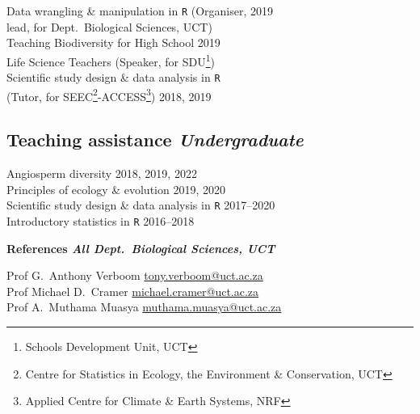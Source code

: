 \documentclass[10pt]{article}
\begin{document}
\begin{multicols}{2}
Data wrangling \& manipulation in \texttt{R}
  {\small (Organiser,}                             \hfill {\small       2019} \\
  \hspace{2em} {\small lead, for Dept.~Biological
    Sciences, UCT)}                                                           \\
Teaching Biodiversity for High School              \hfill {\small       2019} \\
  \hspace{2em} Life Science Teachers {\small
    (Speaker, for SDU\footnote{Schools Development
    Unit, UCT})}                                                              \\
Scientific study design \& data analysis in \texttt{R}                        \\
  \hspace{2em} {\small(Tutor, for SEEC\footnote{
    Centre for Statistics in Ecology, the
    Environment \& Conservation, UCT}-ACCESS\footnote{
      Applied Centre for Climate \& Earth Systems,
      NRF})}                                       \hfill {\small 2018, 2019}

\subsection*{Teaching assistance %
                                \hfill {\small \textmd{\textit{Undergraduate}}}}

Angiosperm diversity                         \hfill {\small 2018, 2019, 2022} \\
Principles of ecology \& evolution           \hfill {\small       2019, 2020} \\
Scientific study design \& data analysis in \texttt{R}
                                             \hfill {\small       2017--2020} \\
Introductory statistics in \texttt{R}        \hfill {\small       2016--2018}

\textbf{References %
           \hfill {\small \textmd{\textit{All Dept.~Biological Sciences, UCT}}}}

Prof G.~Anthony Verboom
      \hfill     \href{mailto:tony.verboom@uct.ac.za}{tony.verboom@uct.ac.za} \\
Prof Michael D.~Cramer
      \hfill \href{mailto:michael.cramer@uct.ac.za}{michael.cramer@uct.ac.za} \\
Prof A.~Muthama Muasya
      \hfill \href{mailto:muthama.muasya@uct.ac.za}{muthama.muasya@uct.ac.za} \\


\end{multicols}
\end{document}
